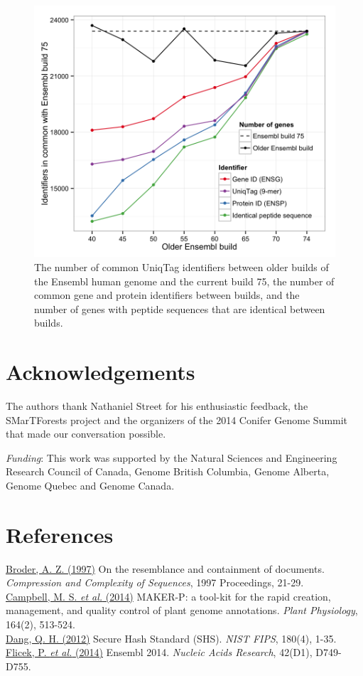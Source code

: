 \documentclass{bioinfo}
\begin{document}
\begin{figure}[htbp]
\centering
\includegraphics{ensembl.png}
\caption{The number of common UniqTag identifiers between older builds
of the Ensembl human genome and the current build 75, the number of
common gene and protein identifiers between builds, and the number of
genes with peptide sequences that are identical between builds.}
\end{figure}

\section*{Acknowledgements}\label{acknowledgements}

The authors thank Nathaniel Street for his enthusiastic feedback, the
SMarTForests project and the organizers of the 2014 Conifer Genome
Summit that made our conversation possible.

\emph{Funding}: This work was supported by the Natural Sciences and
Engineering Research Council of Canada, Genome British Columbia, Genome
Alberta, Genome Quebec and Genome Canada.

\section*{References}\label{references}

\href{http://dx.doi.org/10.1109/SEQUEN.1997.666900}{Broder, A. Z.
(1997)} On the resemblance and containment of documents.
\emph{Compression and Complexity of Sequences}, 1997 Proceedings,
21-29.\\\href{http://dx.doi.org/10.1104/pp.113.230144}{Campbell, M. S.
\emph{et al.} (2014)} MAKER-P: a tool-kit for the rapid creation,
management, and quality control of plant genome annotations. \emph{Plant
Physiology}, 164(2),
513-524.\\\href{http://www.nist.gov/manuscript-publication-search.cfm?pub_id=910977}{Dang,
Q. H. (2012)} Secure Hash Standard (SHS). \emph{NIST FIPS}, 180(4),
1-35.\\\href{http://dx.doi.org/10.1093/nar/gkt1196}{Flicek, P. \emph{et
al.} (2014)} Ensembl 2014. \emph{Nucleic Acids Research}, 42(D1),
D749-D755.
\end{document}
